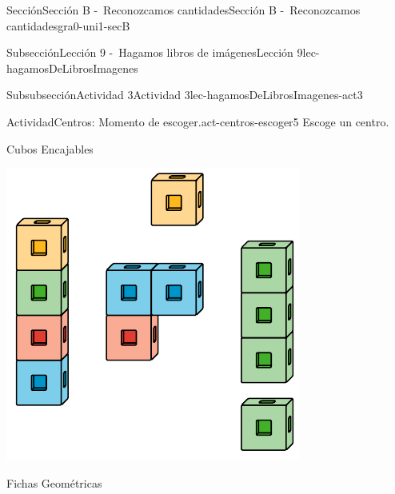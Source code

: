 \documentclass[twoside,10pt,]{article}
\begin{document}
\begin{sectionptx}{Sección}{Sección B -~Reconozcamos cantidades}{}{Sección B -~Reconozcamos cantidades}{}{}{gra0-uni1-secB}
\begin{subsectionptx}{Subsección}{Lección 9 -~Hagamos libros de imágenes}{}{Lección 9}{}{}{lec-hagamosDeLibrosImagenes}
\typeout{************************************************}
%
\begin{subsubsectionptx}{Subsubsección}{Actividad 3}{}{Actividad 3}{}{}{lec-hagamosDeLibrosImagenes-act3}
\begin{activity}{Actividad}{Centros: Momento de escoger.}{act-centros-escoger5}%
Escoge un centro.%
\begin{sidebyside}{2}{0.025}{0.025}{0.05}%
\begin{sbspanel}{0.45}%
Cubos Encajables%
\par
\includegraphics[width=\linewidth]{external/svg-source/tikz-file-128850.pdf}
\end{sbspanel}%
\begin{sbspanel}{0.45}%
Fichas Geométricas%
\par

\end{sbspanel}
\end{sidebyside}
\end{activity}
\end{subsubsectionptx}
\end{subsectionptx}
\end{sectionptx}
\end{document}
